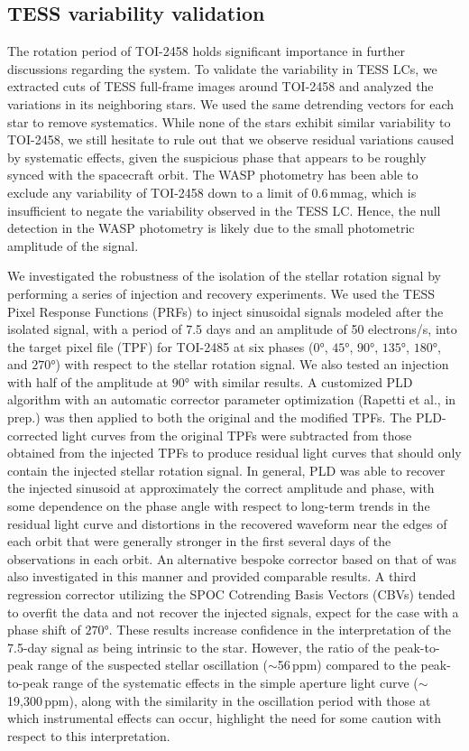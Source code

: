 \documentclass[traditabstract,longauth]{aa}
\begin{document}
\subsection{TESS variability validation} \label{variability}

The rotation period of TOI-2458 holds significant importance in further discussions regarding the system. To validate the variability in TESS LCs, we extracted cuts of TESS full-frame images around TOI-2458 and analyzed the variations in its neighboring stars. We used the same detrending vectors for each star to remove systematics. While none of the stars exhibit similar variability to TOI-2458, we still hesitate to rule out that we observe residual variations caused by systematic effects, given the suspicious phase that appears to be roughly synced with the spacecraft orbit. The WASP photometry has been able to exclude any variability of TOI-2458 down to a limit of 0.6\,mmag, which is insufficient to negate the variability observed in the TESS LC. Hence, the null detection in the WASP photometry is likely due to the small photometric amplitude of the signal. 

We investigated the robustness of the isolation of the stellar rotation signal by performing a series of injection and recovery experiments. We used the TESS Pixel Response Functions (PRFs) to inject sinusoidal signals modeled after the isolated signal, with a period of 7.5 days and an amplitude of 50 electrons/s, into the target pixel file (TPF) for TOI-2485 at six phases ($\ang{0}$, $\ang{45}$, $\ang{90}$, $\ang{135}$, $\ang{180}$, and $\ang{270}$) with respect to the stellar rotation signal. We also tested an injection with half of the amplitude at $\ang{90}$ with similar results. A customized PLD algorithm with an automatic corrector parameter optimization (Rapetti et al., in prep.) was then applied to both the original and the modified TPFs. The PLD-corrected light curves from the original TPFs were subtracted from those obtained from the injected TPFs to produce residual light curves that should only contain the injected stellar rotation signal. In general, PLD was able to recover the injected sinusoid at approximately the correct amplitude and phase, with some dependence on the phase angle with respect to long-term trends in the residual light curve and distortions in the recovered waveform near the edges of each orbit that were generally stronger in the first several days of the observations in each orbit. An alternative bespoke corrector based on that of \citet{Hedges21} was also investigated in this manner and provided comparable results. A third regression corrector utilizing the SPOC Cotrending Basis Vectors (CBVs) tended to overfit the data and not recover the injected signals, expect for the case with a phase shift of $\ang{270}$. These results increase confidence in the interpretation of the 7.5-day signal as being intrinsic to the star. However, the ratio of the peak-to-peak range of the suspected stellar oscillation ($\sim$56\,ppm) compared to the peak-to-peak range of the systematic effects in the simple aperture light curve ($\sim$19,300\,ppm), along with the similarity in the oscillation period with those at which instrumental effects can occur, highlight the need for some caution with respect to this interpretation.
\end{document}
